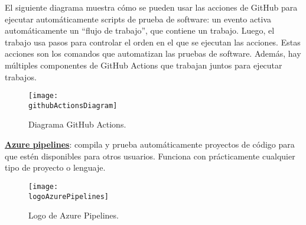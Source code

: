 \begin{compactitem}
    El siguiente diagrama muestra cómo se pueden usar las acciones de GitHub para ejecutar automáticamente scripts de prueba de software: un evento activa automáticamente un “flujo de trabajo”, que contiene un trabajo. Luego, el trabajo usa pasos para controlar el orden en el que se ejecutan las acciones. Estas acciones son los comandos que automatizan las pruebas de software. Además, hay múltiples componentes de GitHub Actions que trabajan juntos para ejecutar trabajos.
    \begin{figure}[h]
        \centering
        \texttt{[image: \\githubActionsDiagram]}
        \caption{Diagrama GitHub Actions.}
    \end{figure}
    \item \textbf{\underline{Azure pipelines}}: compila y prueba automáticamente proyectos de código para que estén disponibles para otros usuarios. Funciona con prácticamente cualquier tipo de proyecto o lenguaje.
    \begin{figure}[h]
        \centering
        \texttt{[image: \\logoAzurePipelines]}
        \caption{Logo de Azure Pipelines.}
    \end{figure}
    

\end{compactitem}
